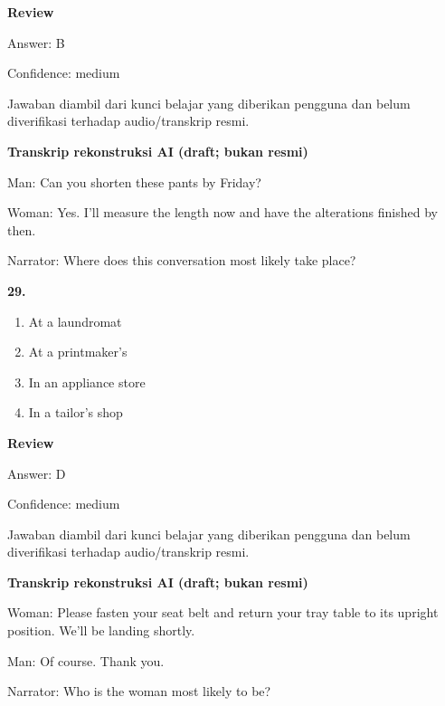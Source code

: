\documentclass[12pt]{article}
\begin{document}
\par
\begingroup
\setlength{\parskip}{0pt}
\setlength{\parindent}{0pt}
\textbf{Review}\par
Answer: B\par
Confidence: medium\par
Jawaban diambil dari kunci belajar yang diberikan pengguna dan belum diverifikasi terhadap audio/transkrip resmi.\par
\endgroup
\par
\vspace{0.25\baselineskip}
\begin{exampleblock}
\textbf{Transkrip rekonstruksi AI (draft; bukan resmi)}\par
Man: Can you shorten these pants by Friday?\par
Woman: Yes. I'll measure the length now and have the alterations finished by then.\par
Narrator: Where does this conversation most likely take place?\par
\end{exampleblock}
\noindent\textbf{29.}
\begin{enumerate}[label=(\Alph*),leftmargin=*,itemsep=0.2em]
\item At a laundromat
\item At a printmaker's
\item In an appliance store
\item In a tailor's shop
\end{enumerate}
\par
\begingroup
\setlength{\parskip}{0pt}
\setlength{\parindent}{0pt}
\textbf{Review}\par
Answer: D\par
Confidence: medium\par
Jawaban diambil dari kunci belajar yang diberikan pengguna dan belum diverifikasi terhadap audio/transkrip resmi.\par
\endgroup
\par
\vspace{0.25\baselineskip}
\begin{exampleblock}
\textbf{Transkrip rekonstruksi AI (draft; bukan resmi)}\par
Woman: Please fasten your seat belt and return your tray table to its upright position. We'll be landing shortly.\par
Man: Of course. Thank you.\par
Narrator: Who is the woman most likely to be?\par
\end{exampleblock}
\end{document}
